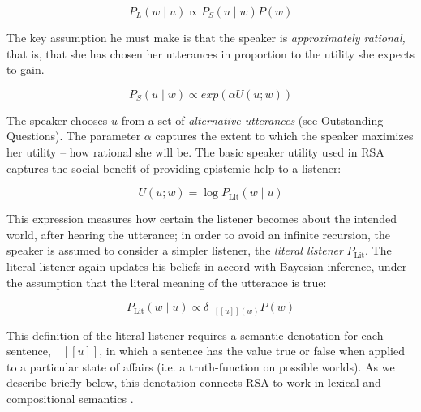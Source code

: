 \documentclass[]{elsarticle}
\newcommand{\denote}[1]{\mbox{ $[\![ #1 ]\!]$}}
\begin{document}
$$P_L(w\mid u) \propto P_S(u \mid w)P(w)$$

The key assumption he must make is that the speaker is
\emph{approximately rational,} that is, that she has chosen her
utterances in proportion to the utility she expects to gain.

$$P_S(u\mid w) \propto exp(\alpha
U(u;w))$$

The speaker chooses $u$ from a set of \emph{alternative utterances}
(see Outstanding Questions). The parameter $\alpha$
captures the extent to which the speaker maximizes her utility --
how rational she will be. The basic speaker utility used in RSA
captures the social benefit of providing epistemic help to a listener:

$$U(u;w) = \log P_{\text{Lit}}(w \mid u)$$

This expression measures how certain the listener becomes about the intended world, after hearing the utterance; in order to avoid an infinite recursion, the speaker is
assumed to consider a simpler listener, the \emph{literal listener}
$P_{\text{Lit}}$. The literal listener again updates his beliefs in
accord with Bayesian inference, under the assumption that the literal
meaning of the utterance is true:

$$P_{\text{Lit}}(w\mid u) \propto \delta_{\denote{u}(w)}P(w)$$

This definition of the literal listener requires a semantic denotation
for each sentence, $\denote{u}$, in which a sentence
has the value true or false when applied to a particular state of
affairs (i.e. a truth-function on possible worlds). As we describe
briefly below, this denotation connects RSA to work in lexical and
compositional semantics \citep{heim1998,dowty2012}.

\end{document}
